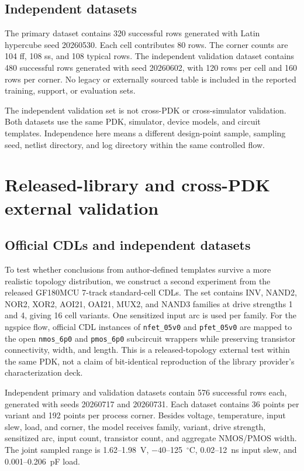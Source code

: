 \documentclass[preprint,12pt]{elsarticle}
\begin{document}
\subsection{Independent datasets}

The primary dataset contains 320 successful rows generated with Latin hypercube seed 20260530. Each cell contributes 80 rows. The corner counts are 104 ff, 108 ss, and 108 typical rows. The independent validation dataset contains 480 successful rows generated with seed 20260602, with 120 rows per cell and 160 rows per corner. No legacy or externally sourced table is included in the reported training, support, or evaluation sets.

The independent validation set is not cross-PDK or cross-simulator validation. Both datasets use the same PDK, simulator, device models, and circuit templates. Independence here means a different design-point sample, sampling seed, netlist directory, and log directory within the same controlled flow.

\section{Released-library and cross-PDK external validation}

\subsection{Official CDLs and independent datasets}

To test whether conclusions from author-defined templates survive a more realistic topology distribution, we construct a second experiment from the released GF180MCU 7-track standard-cell CDLs. The set contains INV, NAND2, NOR2, XOR2, AOI21, OAI21, MUX2, and NAND3 families at drive strengths 1 and 4, giving 16 cell variants. One sensitized input arc is used per family. For the ngspice flow, official CDL instances of \texttt{nfet\_05v0} and \texttt{pfet\_05v0} are mapped to the open \texttt{nmos\_6p0} and \texttt{pmos\_6p0} subcircuit wrappers while preserving transistor connectivity, width, and length. This is a released-topology external test within the same PDK, not a claim of bit-identical reproduction of the library provider's characterization deck.

Independent primary and validation datasets contain 576 successful rows each, generated with seeds 20260717 and 20260731. Each dataset contains 36 points per variant and 192 points per process corner. Besides voltage, temperature, input slew, load, and corner, the model receives family, variant, drive strength, sensitized arc, input count, transistor count, and aggregate NMOS/PMOS width. The joint sampled range is 1.62--1.98~V, $-40$--125~$^\circ$C, 0.02--12~ns input slew, and 0.001--0.206~pF load.
\end{document}
